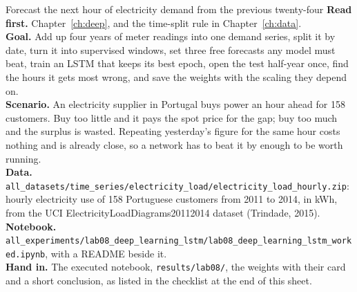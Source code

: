 
\begin{labproject}{Forecast the next hour of electricity demand from the previous twenty-four}
\textbf{Read first.} Chapter~\ref{ch:deep}, and the time-split rule in Chapter~\ref{ch:data}.\\
\textbf{Goal.} Add up four years of meter readings into one demand series, split it by date, turn it into supervised windows, set three free forecasts any model must beat, train an LSTM that keeps its best epoch, open the test half-year once, find the hours it gets most wrong, and save the weights with the scaling they depend on.\\
\textbf{Scenario.} An electricity supplier in Portugal buys power an hour ahead for 158 customers. Buy too little and it pays the spot price for the gap; buy too much and the surplus is wasted. Repeating yesterday's figure for the same hour costs nothing and is already close, so a network has to beat it by enough to be worth running.\\
\textbf{Data.} \texttt{all\_datasets/\allowbreak time\_series/\allowbreak electricity\_load/\allowbreak electricity\_load\_hourly.zip}: hourly electricity use of 158 Portuguese customers from 2011 to 2014, in kWh, from the UCI ElectricityLoadDiagrams20112014 dataset (Trindade, 2015).\\
\textbf{Notebook.} \texttt{all\_experiments/\allowbreak lab08\_deep\_learning\_lstm/\allowbreak lab08\_deep\_learning\_lstm\_worked.ipynb}, with a README beside it.\\
\textbf{Hand in.} The executed notebook, \texttt{results/lab08/}, the weights with their card and a short conclusion, as listed in the checklist at the end of this sheet.
\end{labproject}


